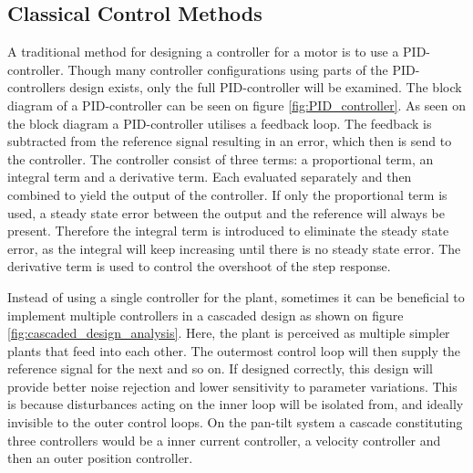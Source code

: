 \documentclass[../../main.tex]{subfiles}
\begin{document}
\subsection*{Classical Control Methods}\label{subsec:classic_control}


A traditional method for designing a controller for a motor is to use a PID-controller. Though many controller configurations using parts of the PID-controllers design exists, only the full PID-controller will be examined. The block diagram of a PID-controller can be seen on figure \ref{fig:PID_controller}. As seen on the block diagram
a PID-controller utilises a feedback loop. The feedback is subtracted from the reference signal resulting in an error, which then is send to the controller. The controller consist of three terms: a proportional term, an integral term and a derivative term. Each evaluated separately and then combined to yield the output of the controller. If only the proportional term is used, a steady state error between the output and the reference will always be present. Therefore the integral term is introduced to eliminate the steady state error, as the integral will keep increasing until there is no steady state error. The derivative term is used to control the overshoot of the step response.

Instead of using a single controller for the plant, sometimes it can be beneficial to implement multiple controllers in a cascaded design as shown on figure \ref{fig:cascaded_design_analysis}. Here, the plant is perceived as multiple simpler plants that feed into each other. The outermost control loop will then supply the reference signal for the next and so on. If designed correctly, this design will provide better noise rejection and lower sensitivity to parameter variations. This is because disturbances acting on the inner loop will be isolated from, and ideally invisible to the outer control loops. On the pan-tilt system a cascade constituting three controllers would be a inner current controller, a velocity controller and then an outer position controller.

\end{document}

